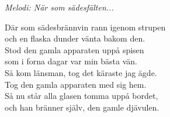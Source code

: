 {\footnotesize\textit{Melodi: När som sädesfälten...}}\par
\vspace{10pt}
Där som sädesbrännvin rann igenom strupen\\
och en flaska dunder vänta bakom den.\\
Stod den gamla apparaten uppå spisen\\
som i forna dagar var min bästa vän.\\
Så kom länsman, tog det käraste jag ägde.\\
Tog den gamla apparaten med sig hem.\\
Så nu står alla glasen tomma uppå bordet,\\
och han bränner själv, den gamle djävulen.
